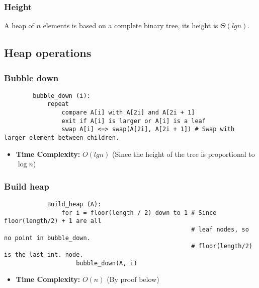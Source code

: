     \subsubsection{Height}
    \begin{definition}
        A heap of $n$ elements is based on a complete binary tree, its height is $\Theta(lg n)$.
    \end{definition}

\subsection{Heap operations}
    \subsubsection{Bubble down}
    \begin{definition}
        \begin{lstlisting}
        bubble_down (i):
            repeat
                compare A[i] with A[2i] and A[2i + 1]
                exit if A[i] is larger or A[i] is a leaf
                swap A[i] <=> swap(A[2i], A[2i + 1]) # Swap with larger element between children.
        \end{lstlisting}
        \begin{itemize}
            \item \textbf{Time Complexity:} $O(lg n)$ (Since the height of the tree is proportional to $\log n$)
        \end{itemize}

    \end{definition}

    \subsubsection{Build heap}
    \begin{definition}
        \begin{lstlisting}
            Build_heap (A):
                for i = floor(length / 2) down to 1 # Since floor(length/2) + 1 are all
                                                    # leaf nodes, so no point in bubble_down.
                                                    # floor(length/2) is the last int. node.
                    bubble_down(A, i)
        \end{lstlisting}
        \begin{itemize}
            \item \textbf{Time Complexity:} $O(n)$ (By proof below)
        \end{itemize}


    \end{definition}

